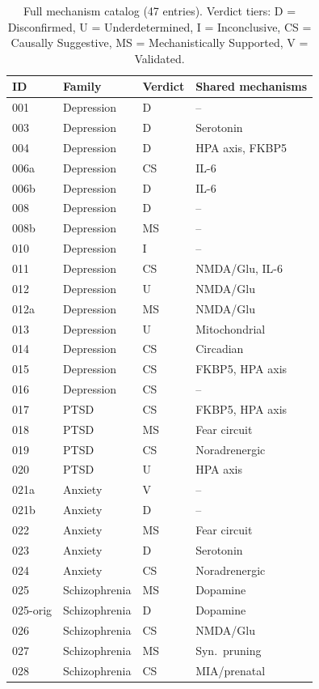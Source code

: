 \documentclass{article}
\begin{document}
\begin{table}[h]
\centering
\caption{Full mechanism catalog (47 entries). Verdict tiers: D = Disconfirmed, U = Underdetermined, I = Inconclusive, CS = Causally Suggestive, MS = Mechanistically Supported, V = Validated.}
\label{tab:catalog}
\footnotesize
\begin{tabular}{llll}
\toprule
ID & Family & Verdict & Shared mechanisms \\
\midrule
001 & Depression & D & -- \\
003 & Depression & D & Serotonin \\
004 & Depression & D & HPA axis, FKBP5 \\
006a & Depression & CS & IL-6 \\
006b & Depression & D & IL-6 \\
008 & Depression & D & -- \\
008b & Depression & MS & -- \\
010 & Depression & I & -- \\
011 & Depression & CS & NMDA/Glu, IL-6 \\
012 & Depression & U & NMDA/Glu \\
012a & Depression & MS & NMDA/Glu \\
013 & Depression & U & Mitochondrial \\
014 & Depression & CS & Circadian \\
015 & Depression & CS & FKBP5, HPA axis \\
016 & Depression & CS & -- \\
\midrule
017 & PTSD & CS & FKBP5, HPA axis \\
018 & PTSD & MS & Fear circuit \\
019 & PTSD & CS & Noradrenergic \\
020 & PTSD & U & HPA axis \\
\midrule
021a & Anxiety & V & -- \\
021b & Anxiety & D & -- \\
022 & Anxiety & MS & Fear circuit \\
023 & Anxiety & D & Serotonin \\
024 & Anxiety & CS & Noradrenergic \\
\midrule
025 & Schizophrenia & MS & Dopamine \\
025-orig & Schizophrenia & D & Dopamine \\
026 & Schizophrenia & CS & NMDA/Glu \\
027 & Schizophrenia & MS & Syn.\ pruning \\
028 & Schizophrenia & CS & MIA/prenatal \\

\end{tabular}
\end{table}
\end{document}
